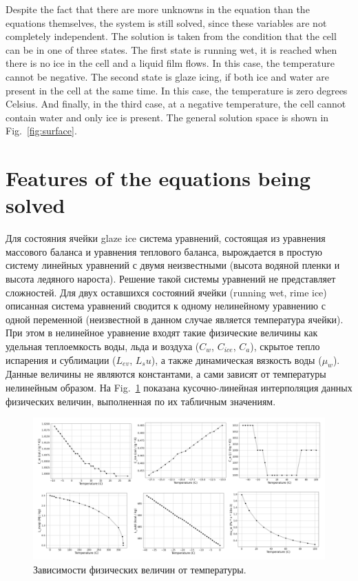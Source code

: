 \documentclass[
11pt,%
tightenlines,%
twoside,%
onecolumn,%
nofloats,%
nobibnotes,%
nofootinbib,%
superscriptaddress,%
noshowpacs,%
centertags]%
{revtex4}
\begin{document}
Despite the fact that there are more unknowns in the equation than the equations themselves, the system is still solved, since these variables are not completely independent.
The solution is taken from the condition that the cell can be in one of three states.
The first state is running wet, it is reached when there is no ice in the cell and a liquid film flows.
In this case, the temperature cannot be negative.
The second state is glaze icing, if both ice and water are present in the cell at the same time.
In this case, the temperature is zero degrees Celsius.
And finally, in the third case, at a negative temperature, the cell cannot contain water and only ice is present.
The general solution space is shown in Fig.~\ref{fig:surface}.

\section{Features of the equations being solved}

Для состояния ячейки glaze ice система уравнений, состоящая из уравнения массового баланса и уравнения теплового баланса, вырождается в простую систему линейных уравнений с двумя неизвестными (высота водяной пленки и высота ледяного нароста).
Решение такой системы уравнений не представляет сложностей.
Для двух оставшихся состояний ячейки (running wet, rime ice) описанная система уравнений сводится к одному нелинейному уравнению с одной переменной (неизвестной в данном случае является температура ячейки).
При этом в нелинейное уравнение входят такие физические величины как удельная теплоемкость воды, льда и воздуха ($C_w$, $C_{ice}$, $C_a$), скрытое тепло испарения и сублимации ($L_{ev}$, $L_su$), а также динамическая вязкость воды ($\mu_w$).
Данные величины не являются константами, а сами зависят от температуры нелинейным образом.
На Fig.~\ref{fig:ph_graphics_h} показана кусочно-линейная интерполяция данных физических величин, выполненная по их табличным значениям.

\begin{figure}[h]
\setcaptionmargin{5mm}
\onelinecaptionstrue
\includegraphics[width=1.0\textwidth]{pics/ph_graphics_h.pdf}
\caption{Зависимости физических величин от температуры.}\label{fig:ph_graphics_h}
\end{figure}
\end{document}
